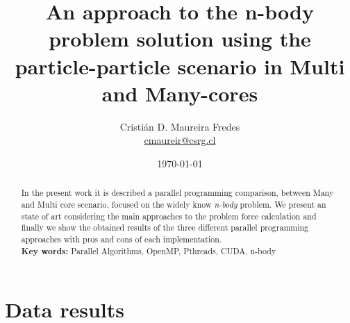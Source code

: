 \documentclass[letter, 10pt]{article}
\begin{document}
\pagestyle{empty}

\title{An approach to the n-body problem solution using the particle-particle scenario in Multi and Many-cores}
\author{Cristián D. Maureira Fredes\\\url{cmaureir@csrg.cl}}
\date{\today}

\maketitle
\begin{abstract}
In the present work it is described a parallel programming
comparison, between Many and Multi core scenario,
focused on the widely know \emph{n-body} problem.
We present an state of art considering the main approaches to
the problem force calculation and finally
we show the obtained results of the three different
parallel programming approaches with pros and cons
of each implementation.
\\
\textbf{Key words:} Parallel Algorithms, OpenMP, Pthreads, CUDA, n-body

\end{abstract}

%
%
%
%
%
%
%
%
%
%
%
%
%
%
%
\newpage
\section{Data results}

\end{document}

